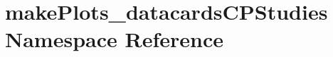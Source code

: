 \hypertarget{namespacemakePlots__datacardsCPStudies}{
\section{makePlots\_\-datacardsCPStudies Namespace Reference}
\label{namespacemakePlots__datacardsCPStudies}
}
